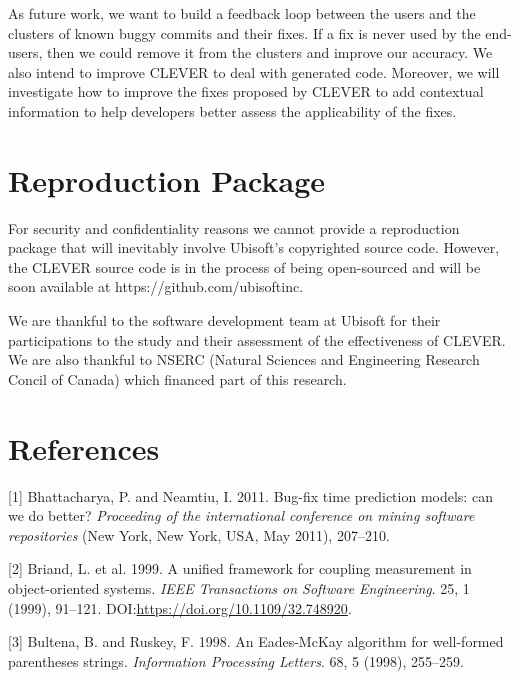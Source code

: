 \documentclass[sigconf]{acmart}
\begin{document}
As future work, we want to build a feedback loop between the users and
the clusters of known buggy commits and their fixes. If a fix is never
used by the end-users, then we could remove it from the clusters and
improve our accuracy. We also intend to improve CLEVER to deal with
generated code. Moreover, we will investigate how to improve the fixes
proposed by CLEVER to add contextual information to help developers
better assess the applicability of the fixes.

\section{Reproduction Package}\label{reproduction-package}

For security and confidentiality reasons we cannot provide a
reproduction package that will inevitably involve Ubisoft's copyrighted
source code. However, the CLEVER source code is in the process of being
open-sourced and will be soon available at
https://github.com/ubisoftinc.

\begin{acks}
We are thankful to the software development team at  Ubisoft for their participations to the study and their assessment of the effectiveness of CLEVER.
We are also thankful to NSERC (Natural Sciences and Engineering Research Concil of Canada) which financed part of this research.
\end{acks}

\section*{References}

\setlength{\parindent}{0pt} \setlength{\parskip}{0.5em}



[1] Bhattacharya, P. and Neamtiu, I. 2011. Bug-fix time prediction
models: can we do better? \emph{Proceeding of the international
conference on mining software repositories} (New York, New York, USA,
May 2011), 207--210.


[2] Briand, L. et al. 1999. A unified framework for coupling
measurement in object-oriented systems. \emph{IEEE Transactions on
Software Engineering}. 25, 1 (1999), 91--121.
DOI:\url{https://doi.org/10.1109/32.748920}.


[3] Bultena, B. and Ruskey, F. 1998. An Eades-McKay algorithm for
well-formed parentheses strings. \emph{Information Processing Letters}.
68, 5 (1998), 255--259.
\end{document}
